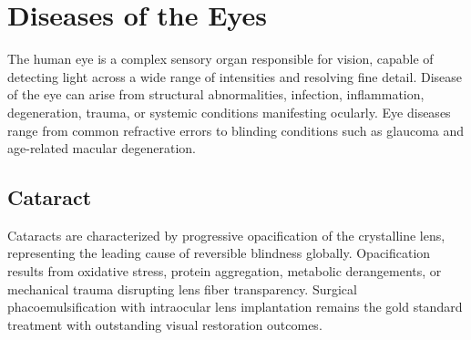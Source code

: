 \chapter{Diseases of the Eyes}
\label{ch:eyes}
The human eye is a complex sensory organ responsible for vision, capable of detecting light across a wide range of intensities and resolving fine detail. Disease of the eye can arise from structural abnormalities, infection, inflammation, degeneration, trauma, or systemic conditions manifesting ocularly. Eye diseases range from common refractive errors to blinding conditions such as glaucoma and age-related macular degeneration.

\section{Cataract}




Cataracts are characterized by progressive opacification of the crystalline lens, representing the leading cause of reversible blindness globally. Opacification results from oxidative stress, protein aggregation, metabolic derangements, or mechanical trauma disrupting lens fiber transparency. Surgical phacoemulsification with intraocular lens implantation remains the gold standard treatment with outstanding visual restoration outcomes.





\label{sec:Cataract}

